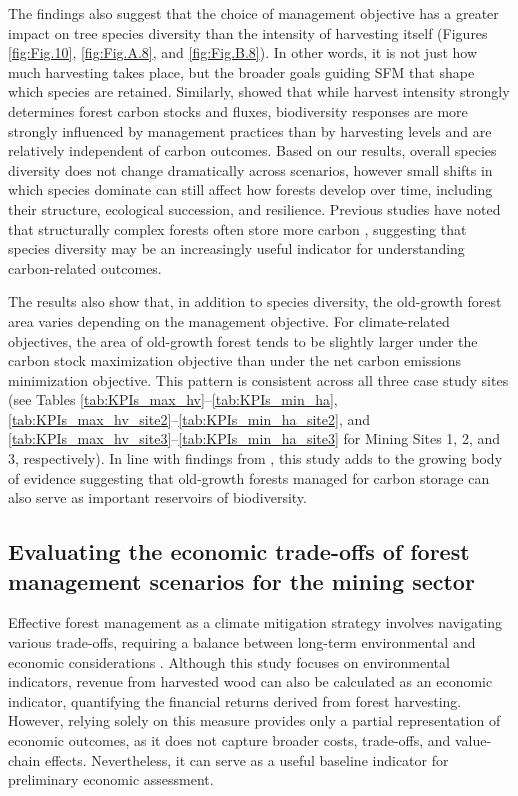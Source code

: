 \documentclass[preprint,12pt]{elsarticle}
\begin{document}
The findings also suggest that the choice of management objective has a greater impact on tree species diversity than the intensity of harvesting itself (Figures \ref{fig:Fig.10}, \ref{fig:Fig.A.8}, and \ref{fig:Fig.B.8}). In other words, it is not just how much harvesting takes place, but the broader goals guiding SFM that shape which species are retained. Similarly, \citet{Makela2023} showed that while harvest intensity strongly determines forest carbon stocks and fluxes, biodiversity responses are more strongly influenced by management practices than by harvesting levels and are relatively independent of carbon outcomes. Based on our results, overall species diversity does not change dramatically across scenarios, however small shifts in which species dominate can still affect how forests develop over time, including their structure, ecological succession, and resilience. Previous studies have noted that structurally complex forests often store more carbon \citep{Thom2019}, suggesting that species diversity may be an increasingly useful indicator for understanding carbon-related outcomes. 

The results also show that, in addition to species diversity, the old-growth forest area varies depending on the management objective. For climate-related objectives, the area of old-growth forest tends to be slightly larger under the carbon stock maximization objective than under the net carbon emissions minimization objective. This pattern is consistent across all three case study sites (see Tables \ref{tab:KPIs_max_hv}–\ref{tab:KPIs_min_ha}, \ref{tab:KPIs_max_hv_site2}–\ref{tab:KPIs_min_ha_site2}, and \ref{tab:KPIs_max_hv_site3}–\ref{tab:KPIs_min_ha_site3} for Mining Sites 1, 2, and 3, respectively). In line with findings from \citet{McGarvey2015}, this study adds to the growing body of evidence suggesting that old-growth forests managed for carbon storage can also serve as important reservoirs of biodiversity. 

\subsection{Evaluating the economic trade-offs of forest management scenarios for the mining sector}
\label{sec: Evaluating the Economic Trade-offs of Forest Management Scenarios for the Mining Sector}


Effective forest management as a climate mitigation strategy involves navigating various trade-offs, requiring a balance between long-term environmental and economic considerations \citep{Waring2020}. Although this study focuses on environmental indicators, revenue from harvested wood can also be calculated as an economic indicator, quantifying the financial returns derived from forest harvesting. However, relying solely on this measure provides only a partial representation of economic outcomes, as it does not capture broader costs, trade-offs, and value-chain effects. Nevertheless, it can serve as a useful baseline indicator for preliminary economic assessment.
\end{document}
